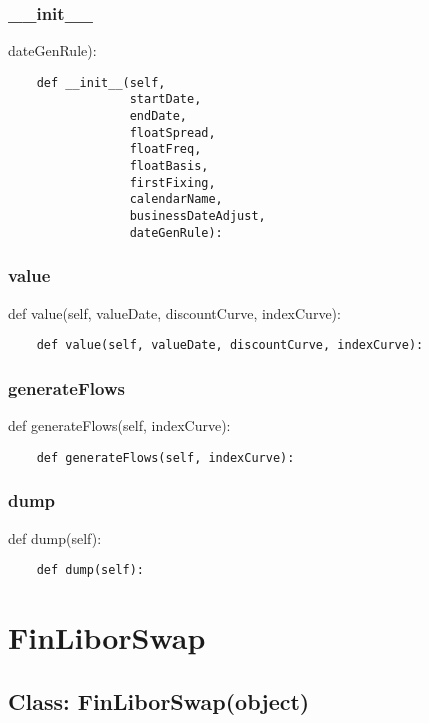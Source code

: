 \documentclass[twoside,11pt]{book}
\begin{document}
\subsubsection*{{\bf \_\_init\_\_}}
dateGenRule): 

\begin{lstlisting}
    def __init__(self,
                 startDate,
                 endDate,
                 floatSpread,
                 floatFreq,
                 floatBasis,
                 firstFixing,
                 calendarName,
                 businessDateAdjust,
                 dateGenRule):
\end{lstlisting}

\subsubsection*{{\bf value}}
def value(self, valueDate, discountCurve, indexCurve): 

\begin{lstlisting}
    def value(self, valueDate, discountCurve, indexCurve):
\end{lstlisting}

\subsubsection*{{\bf generateFlows}}
def generateFlows(self, indexCurve): 

\begin{lstlisting}
    def generateFlows(self, indexCurve):
\end{lstlisting}

\subsubsection*{{\bf dump}}
def dump(self): 

\begin{lstlisting}
    def dump(self):
\end{lstlisting}

\newpage
\section{FinLiborSwap}

\subsection*{Class: FinLiborSwap(object)}
\end{document}
